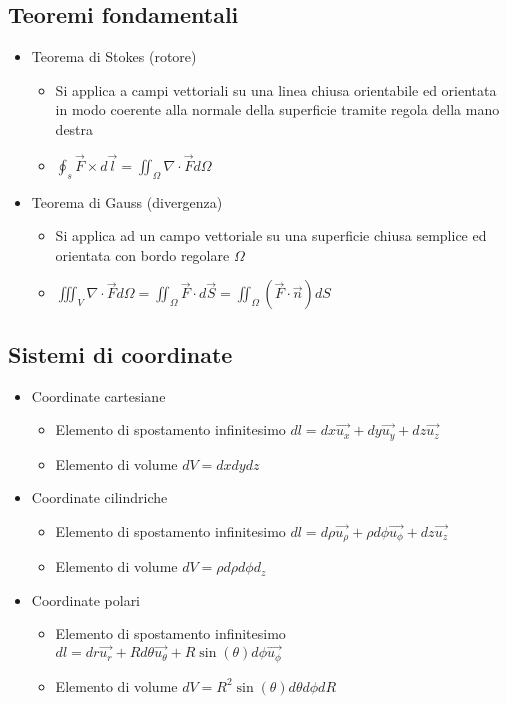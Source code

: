 \documentclass{article}
\begin{document}
\newpage 

\subsection{Teoremi fondamentali}
\begin{itemize}
	\item Teorema di Stokes (rotore)
	\begin{itemize}
		\item Si applica a campi vettoriali su una linea chiusa orientabile ed orientata in modo coerente alla normale della superficie tramite regola della mano destra
		\item \( \displaystyle \oint_s \vec{F} \times d\vec{l} = \iint_\Omega \nabla \cdot \vec{F} d\Omega \)
	\end{itemize}	 
	\item Teorema di Gauss (divergenza)
	\begin{itemize}
		\item Si applica ad un campo vettoriale su una superficie chiusa semplice ed orientata con bordo regolare \( \Omega \)
		\item \( \displaystyle \iiint_V \nabla \cdot \vec{F} d\Omega = \iint_\Omega \vec{F} \cdot d\vec{S} = \iint_\Omega \left( \vec{F} \cdot \vec{n} \right) dS \)
	\end{itemize}
\end{itemize}

\subsection{Sistemi di coordinate}
\begin{itemize}
	\item Coordinate cartesiane
	\begin{itemize}
		\item Elemento di spostamento infinitesimo \( dl = dx \vec{u_x} + dy \vec{u_y} + dz \vec{u_z} \)
		\item Elemento di volume \( dV = dx dy dz \)
	\end{itemize}
	
	\item Coordinate cilindriche
	\begin{itemize}
		\item Elemento di spostamento infinitesimo \( dl = d\rho \vec{u_\rho} + \rho d\phi \vec{u_\phi} + dz \vec{u_z} \)
		\item Elemento di volume \( dV = \rho d\rho d\phi d_z\)
	\end{itemize}
	
	\item Coordinate polari
	\begin{itemize}
		\item Elemento di spostamento infinitesimo \( dl = dr \vec{u_r} + R d\theta \vec{u_\theta} + R \sin\left(\theta\right) d\phi \vec{u_\phi} \)
		\item Elemento di volume \( dV = R^2 \sin\left(\theta\right) d\theta d\phi dR \)
	\end{itemize}
\end{itemize}
\end{document}
